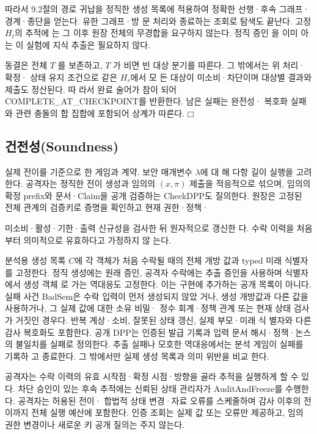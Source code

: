 따라서 9.2절의 경로 귀납을 정직한 생성 목록에 적용하여
정확한 선행·후속 그래프·경계·종단을 얻는다. 유한 그래프·방
문 처리와 종료하는 조회로 탐색도 끝난다. 고정 \(H_{t}\)의 추적에
는 그 이후 원장 전체의 무경합을 요구하지 않는다. 정직 증인
을 이미 아는 이 실험에 지식 추출은 필요하지 않다.

동결은 전체 \(T\) 를 보존하고, \(T\) 가 비면 빈 대상 분기를 따른다.
그 밖에서는 위 처리·확정· 상태 유지 조건으로 같은 \(H_{r}\)에서 모
든 대상이 미소비·차단이며 대상별 결과와 제출도 정산된다. 따
라서 완료 술어가 참이 되어 COMPLETE\_AT\_CHECKPOINT를
반환한다. 남은 실패는 완전성· 복호화 실패와 관련 충돌의 합
집합에 포함되어 상계가 따른다. \(□\)

\subsection{건전성(Soundness)}
실제 전이를 기준으로 한 게임과 계약. 보안 매개변수 \(λ\)에 대
해 다항 길이 실행을 고려한다. 공격자는 정직한 전이 생성과
임의의 \((x,π)\) 제출을 적응적으로 섞으며, 임의의 확정 prefix와
문서·Claim을 공개 검증하는 CheckDPP도 질의한다. 원장은
고정된 전체 관계의 검증키로 증명을 확인하고 현재 권한·정책·

미소비·활성·기한·출력 신규성을 검사한 뒤 원자적으로 갱신한
다. 수락 이력을 처음부터 의미적으로 유효하다고 가정하지 않
는다.

분석용 생성 목록 \(C\)에 각 객체가 처음 수락될 때의 전체 개방
값과 typed 미래 식별자를 고정한다. 정직 생성에는 원래 증인,
공격자 수락에는 추출 증인을 사용하며 식별자에서 생성 객체
로 가는 역대응도 고정한다. 이는 구현에 추가하는 공개 목록이
아니다. 실패 사건 BadSem은 수락 입력이 먼저 생성되지 않았
거나, 생성 개방값과 다른 값을 사용하거나, 그 실제 값에 대한
소유 비밀· 정수 회계·정책 관계 또는 현재 상태 검사가 거짓인
경우다. 반복 계상·소비, 잘못된 상태 갱신, 실제 부모·미래 식
별자와 다른 감사 복호화도 포함한다. 공개 DPP는 인증된 발급
기록과 입력 문서 해시·정책·논스의 불일치를 실패로 정의한다.
추출 실패나 모호한 역대응에서는 분석 게임이 실패를 기록하
고 종료한다. 그 밖에서만 실제 생성 목록과 의미 위반을 비교
한다.

공격자는 수락 이력의 유효 시작점·확정 시점·방향을 골라
추적을 실행하게 할 수 있다. 차단 승인이 있는 후속 추적에는
신뢰된 상태 관리자가 AuditAndFreeze를 수행한다. 공격자는
허용된 전이· 합법적 상태 변경·자료 오류를 스케줄하며 감사
이후의 전이까지 전체 실행 예산에 포함한다. 인증 조회는 실제
값 또는 오류만 제공하고, 임의 권한 변경이나 새로운 키 공개
질의는 주지 않는다.

